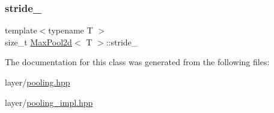 \subsubsection{\texorpdfstring{stride\_}{stride\_}}
{\footnotesize\ttfamily template$<$typename T $>$ \\
size\+\_\+t \mbox{\hyperlink{class_max_pool2d}{Max\+Pool2d}}$<$ T $>$\+::stride\+\_\+\hspace{0.3cm}{\ttfamily [protected]}}



The documentation for this class was generated from the following files\+:\begin{DoxyCompactItemize}
\item 
layer/\mbox{\hyperlink{pooling_8hpp}{pooling.\+hpp}}\item 
layer/\mbox{\hyperlink{pooling__impl_8hpp}{pooling\+\_\+impl.\+hpp}}\end{DoxyCompactItemize}
